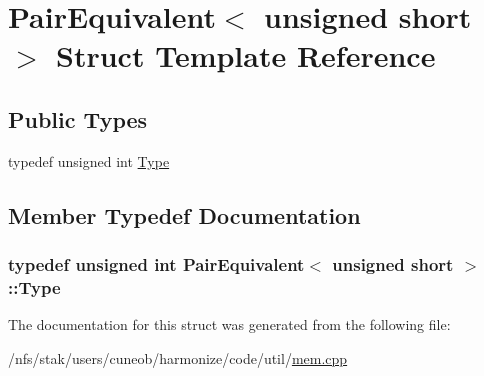 \hypertarget{structPairEquivalent_3_01unsigned_01short_01_4}{\section{Pair\-Equivalent$<$ unsigned short $>$ Struct Template Reference}
\label{structPairEquivalent_3_01unsigned_01short_01_4}
}
\subsection*{Public Types}
\begin{DoxyCompactItemize}
\item 
typedef unsigned int \hyperlink{structPairEquivalent_3_01unsigned_01short_01_4_a3f97047c3fae0bab09febf00fe4e724c}{Type}
\end{DoxyCompactItemize}


\subsection{Member Typedef Documentation}
\hypertarget{structPairEquivalent_3_01unsigned_01short_01_4_a3f97047c3fae0bab09febf00fe4e724c}{
\subsubsection[{Type}]{\setlength{\rightskip}{0pt plus 5cm}typedef unsigned int {\bf Pair\-Equivalent}$<$ unsigned short $>$\-::{\bf Type}}}\label{structPairEquivalent_3_01unsigned_01short_01_4_a3f97047c3fae0bab09febf00fe4e724c}


The documentation for this struct was generated from the following file\-:\begin{DoxyCompactItemize}
\item 
/nfs/stak/users/cuneob/harmonize/code/util/\hyperlink{mem_8cpp}{mem.\-cpp}\end{DoxyCompactItemize}
